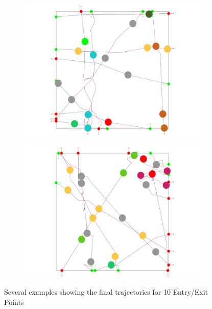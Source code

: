 \begin{figure}[t]
\begin{subfigure}[b]{0.24\linewidth}
 	\includegraphics[width=\linewidth]{images/res-10-withAgents_3.png}
 	\caption{}
 \end{subfigure}
 \begin{subfigure}[b]{0.24\linewidth}
 	\includegraphics[width=\linewidth]{images/res-10-withAgents_4.png}
 	\caption{}
 \end{subfigure}
 \caption{Several examples showing the final trajectories for 10 Entry/Exit Points}
 \label{fig:res:ten}
\end{figure}

